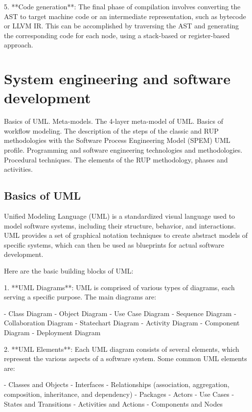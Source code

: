 \documentclass{article}
\begin{document}
5. **Code generation**: The final phase of compilation involves converting the AST to target machine code or an intermediate representation, such as bytecode or LLVM IR. This can be accomplished by traversing the AST and generating the corresponding code for each node, using a stack-based or register-based approach.



\section{System engineering and software development}

Basics of UML. Meta-models. The 4-layer meta-model of UML. Basics of workflow modeling. The description of the steps of the classic and RUP methodologies with the Software Process Engineering Model (SPEM) UML profile. Programming and software engineering technologies and methodologies. Procedural techniques. The elements of the RUP methodology, phases and activities.


\subsection{Basics of UML}

Unified Modeling Language (UML) is a standardized visual language used to model software systems, including their structure, behavior, and interactions. UML provides a set of graphical notation techniques to create abstract models of specific systems, which can then be used as blueprints for actual software development.

Here are the basic building blocks of UML:

1. **UML Diagrams**: UML is comprised of various types of diagrams, each serving a specific purpose. The main diagrams are:

   - Class Diagram
   - Object Diagram
   - Use Case Diagram
   - Sequence Diagram
   - Collaboration Diagram
   - Statechart Diagram
   - Activity Diagram
   - Component Diagram
   - Deployment Diagram

2. **UML Elements**: Each UML diagram consists of several elements, which represent the various aspects of a software system. Some common UML elements are:

   - Classes and Objects
   - Interfaces
   - Relationships (association, aggregation, composition, inheritance, and dependency)
   - Packages
   - Actors
   - Use Cases
   - States and Transitions
   - Activities and Actions
   - Components and Nodes
\end{document}
